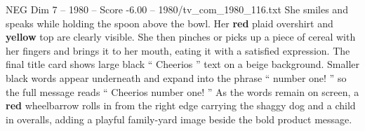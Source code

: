 \begin{textsample}{NEG Dim 7 – 1980 – Score -6.00 – 1980/tv\_com\_1980\_116.txt}
She smiles and speaks while holding the spoon above the bowl.
Her \textbf{red} plaid overshirt and \textbf{yellow} top are clearly visible.
She then pinches or picks up a piece of cereal with her fingers and brings it to her mouth, eating it with a satisfied expression.
The final title card shows large black “ Cheerios ” text on a beige background.
Smaller black words appear underneath and expand into the phrase “ number one! ” so the full message reads “ Cheerios number one! ” As the words remain on screen, a \textbf{red} wheelbarrow rolls in from the right edge carrying the shaggy dog and a child in overalls, adding a playful family-yard image beside the bold product message.

\end{textsample}

